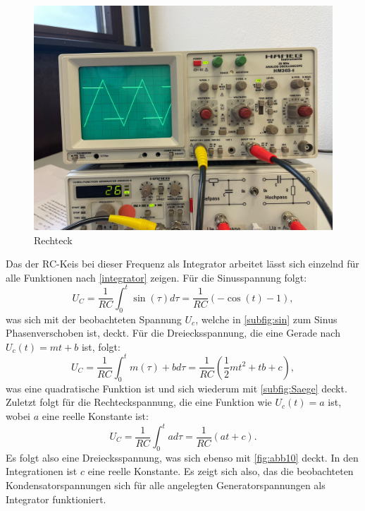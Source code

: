 \begin{figure}[H]
  \centering
  \includegraphics[scale=0.1]{content/rechteckInt.png}
  \caption{Rechteck}
  \label{fig:abb10}
\end{figure}
Das der RC-Keis bei dieser Frequenz als Integrator arbeitet lässt sich einzelnd für alle Funktionen nach \eqref{integrator} zeigen.
Für die Sinusspannung folgt:
\begin{equation*}
  U_C = \frac{1}{RC} \int_{0}^{t} \sin(\tau) d\tau = \frac{1}{RC}\left(-\cos(t) - 1\right),
\end{equation*}
was sich mit der beobachteten Spannung $U_c$, welche in \autoref{subfig:sin} zum Sinus Phasenverschoben ist, deckt.
Für die Dreiecksspannung, die eine Gerade nach $U_c(t) = mt + b$ ist, folgt:
\begin{equation*}
  U_C = \frac{1}{RC} \int_{0}^{t} m(\tau) + b d\tau = \frac{1}{RC}\left(\frac{1}{2}mt^2 + tb + c\right),
\end{equation*}
was eine quadratische Funktion ist und sich wiederum mit \autoref{subfig:Saege} deckt.
Zuletzt folgt für die Rechteckspannung, die eine Funktion wie $U_c(t) = a$ ist, wobei $a$ eine reelle Konstante ist:
\begin{equation*}
  U_C = \frac{1}{RC} \int_{0}^{t} a d\tau = \frac{1}{RC}\left(at + c\right).
\end{equation*}
Es folgt also eine Dreiecksspannung, was sich ebenso mit \autoref{fig:abb10} deckt.
In den Integrationen ist $c$ eine reelle Konstante.
Es zeigt sich also, das die beobachteten Kondensatorspannungen sich für alle angelegten Generatorspannungen als Integrator funktioniert.
